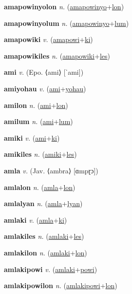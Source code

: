 \textbf{\hypertarget{amapowinyolon}{amapowinyolon}} \textit{n.} (\hyperlink{amapowinyo}{amapowinyo}+\allowbreak \hyperlink{lon}{lon})


\textbf{\hypertarget{amapowinyolum}{amapowinyolum}} \textit{n.} (\hyperlink{amapowinyo}{amapowinyo}+\allowbreak \hyperlink{lum}{lum})


\textbf{\hypertarget{amapowiki}{amapowiki}} \textit{v.} (\hyperlink{amapowi}{amapowi}+\allowbreak \hyperlink{ki}{ki})


\textbf{\hypertarget{amapowikiles}{amapowikiles}} \textit{n.} (\hyperlink{amapowiki}{amapowiki}+\allowbreak \hyperlink{les}{les})


\textbf{\hypertarget{ami}{ami}} \textit{v.} (Epo. ⟨ami⟩ [ˈami])


\textbf{\hypertarget{amiyohau}{amiyohau}} \textit{v.} (\hyperlink{ami}{ami}+\allowbreak \hyperlink{yohau}{yohau})


\textbf{\hypertarget{amilon}{amilon}} \textit{n.} (\hyperlink{ami}{ami}+\allowbreak \hyperlink{lon}{lon})


\textbf{\hypertarget{amilum}{amilum}} \textit{n.} (\hyperlink{ami}{ami}+\allowbreak \hyperlink{lum}{lum})


\textbf{\hypertarget{amiki}{amiki}} \textit{v.} (\hyperlink{ami}{ami}+\allowbreak \hyperlink{ki}{ki})


\textbf{\hypertarget{amikiles}{amikiles}} \textit{n.} (\hyperlink{amiki}{amiki}+\allowbreak \hyperlink{les}{les})


\textbf{\hypertarget{amla}{amla}} \textit{v.} (Jav. ⟨ambra⟩ [ɑmpɽɔ])


\textbf{\hypertarget{amlalon}{amlalon}} \textit{n.} (\hyperlink{amla}{amla}+\allowbreak \hyperlink{lon}{lon})


\textbf{\hypertarget{amlalyan}{amlalyan}} \textit{n.} (\hyperlink{amla}{amla}+\allowbreak \hyperlink{lyan}{lyan})


\textbf{\hypertarget{amlaki}{amlaki}} \textit{v.} (\hyperlink{amla}{amla}+\allowbreak \hyperlink{ki}{ki})


\textbf{\hypertarget{amlakiles}{amlakiles}} \textit{n.} (\hyperlink{amlaki}{amlaki}+\allowbreak \hyperlink{les}{les})


\textbf{\hypertarget{amlakilon}{amlakilon}} \textit{n.} (\hyperlink{amlaki}{amlaki}+\allowbreak \hyperlink{lon}{lon})


\textbf{\hypertarget{amlakipowi}{amlakipowi}} \textit{v.} (\hyperlink{amlaki}{amlaki}+\allowbreak \hyperlink{powi}{powi})


\textbf{\hypertarget{amlakipowilon}{amlakipowilon}} \textit{n.} (\hyperlink{amlakipowi}{amlakipowi}+\allowbreak \hyperlink{lon}{lon})


